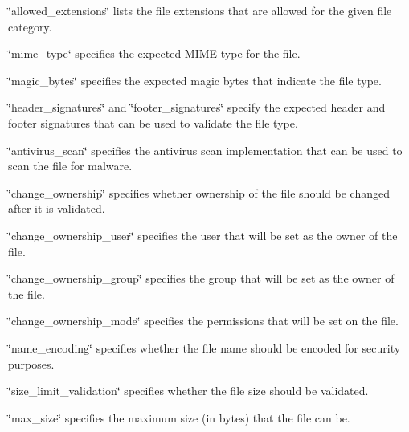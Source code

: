 
\begin{DoxyItemize}
\item \char`\"{}allowed\+\_\+extensions\char`\"{} lists the file extensions that are allowed for the given file category.
\end{DoxyItemize}

\char`\"{}mime\+\_\+type\char`\"{} specifies the expected MIME type for the file.
\begin{DoxyItemize}
\item \char`\"{}magic\+\_\+bytes\char`\"{} specifies the expected magic bytes that indicate the file type.
\item \char`\"{}header\+\_\+signatures\char`\"{} and \char`\"{}footer\+\_\+signatures\char`\"{} specify the expected header and footer signatures that can be used to validate the file type.
\item \char`\"{}antivirus\+\_\+scan\char`\"{} specifies the antivirus scan implementation that can be used to scan the file for malware.
\item \char`\"{}change\+\_\+ownership\char`\"{} specifies whether ownership of the file should be changed after it is validated.
\item \char`\"{}change\+\_\+ownership\+\_\+user\char`\"{} specifies the user that will be set as the owner of the file.
\item \char`\"{}change\+\_\+ownership\+\_\+group\char`\"{} specifies the group that will be set as the owner of the file.
\item \char`\"{}change\+\_\+ownership\+\_\+mode\char`\"{} specifies the permissions that will be set on the file.
\item \char`\"{}name\+\_\+encoding\char`\"{} specifies whether the file name should be encoded for security purposes.
\item \char`\"{}size\+\_\+limit\+\_\+validation\char`\"{} specifies whether the file size should be validated.
\item \char`\"{}max\+\_\+size\char`\"{} specifies the maximum size (in bytes) that the file can be. 
\end{DoxyItemize}